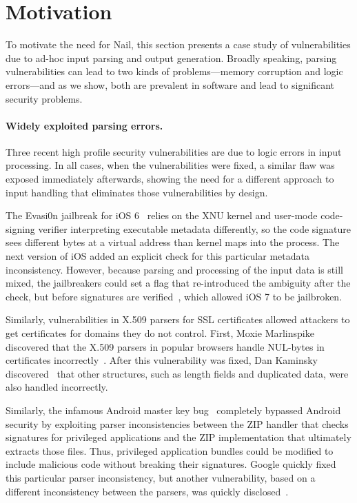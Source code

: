 \section{Motivation}
\label{s:motivation}

To motivate the need for Nail, this section presents a case study of
vulnerabilities due to ad-hoc input parsing and output generation.
Broadly speaking, parsing vulnerabilities can lead to two kinds of
problems---memory corruption and logic errors---and as we show, both
are prevalent in software and lead to significant security problems.

\paragraph{Widely exploited parsing errors.}

Three recent high profile security vulnerabilities are due to logic
errors in input processing.  In all cases, when the vulnerabilities were
fixed, a similar flaw was exposed immediately afterwards, showing the
need for a different approach to input handling that eliminates those
vulnerabilities by design.

The Evasi0n jailbreak for iOS 6~\cite{evaders6} relies on the XNU kernel and
user-mode code-signing verifier interpreting executable metadata differently, so the code signature
sees different bytes at a virtual address than kernel maps into the process. The next version of iOS
added an explicit check for this particular metadata inconsistency. However, because parsing and
processing of the input data is still mixed, the jailbreakers could set a flag that re-introduced
the ambiguity after the check, but before signatures are verified~\cite{geohot-evasion}, which
allowed iOS 7 to be jailbroken.

Similarly, vulnerabilities in X.509 parsers for SSL certificates allowed attackers to get
certificates for domains they do not control. First, Moxie Marlinspike discovered that the X.509
parsers in popular browsers handle NUL-bytes in certificates incorrectly~\cite{Marlinspike:SSL}. After this
vulnerability was fixed, Dan Kaminsky discovered~\cite{DBLP:conf/fc/KaminskyPS10} that other
structures, such as length fields and duplicated data, were also handled incorrectly.

Similarly, the infamous Android master key bug~\cite{saurik-masterkey} completely bypassed Android
security by exploiting parser inconsistencies
between the ZIP handler that checks signatures for privileged applications and the ZIP
implementation that ultimately extracts those files. Thus, privileged application bundles could be
modified to include malicious code without breaking their signatures. Google quickly fixed this
particular parser inconsistency, but another vulnerability, based on a different inconsistency
between the parsers, was quickly disclosed~\cite{saurik-masterkey2}.

